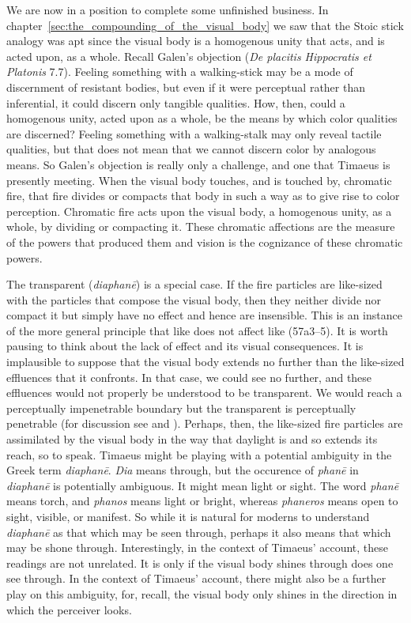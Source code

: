 We are now in a position to complete some unfinished business. In chapter~\ref{sec:the_compounding_of_the_visual_body} we saw that the Stoic stick analogy was apt since the visual body is a homogenous unity that acts, and is acted upon, as a whole. Recall Galen's objection (\emph{De placitis Hippocratis et Platonis} 7.7). Feeling something with a walking-stick may be a mode of discernment of resistant bodies, but even if it were perceptual rather than inferential, it could discern only tangible qualities. How, then, could a homogenous unity, acted upon as a whole, be the means by which color qualities are discerned? Feeling something with a walking-stalk may only reveal tactile qualities, but that does not mean that we cannot discern color by analogous means. So Galen's objection is really only a challenge, and one that Timaeus is presently meeting. When the visual body touches, and is touched by, chromatic fire, that fire divides or compacts that body in such a way as to give rise to color perception. Chromatic fire acts upon the visual body, a homogenous unity, as a whole, by dividing or compacting it. These chromatic affections are the measure of the powers that produced them and vision is the cognizance of these chromatic powers.

The transparent (\emph{diaphanē}) is a special case. If the fire particles are like-sized with the particles that compose the visual body, then they neither divide nor compact it but simply have no effect and hence are insensible. This is an instance of the more general principle that like does not affect like (57a3--5). It is worth pausing to think about the lack of effect and its visual consequences. It is implausible to suppose that the visual body extends no further than the like-sized effluences that it confronts. In that case, we could see no further, and these effluences would not properly be understood to be transparent. We would reach a perceptually impenetrable boundary but the transparent is perceptually penetrable (for discussion see \citealt{Crowther:2018yt} and \citealt{Kalderon:2018wn}). Perhaps, then, the like-sized fire particles are assimilated by the visual body in the way that daylight is and so extends its reach, so to speak. Timaeus might be playing with a potential ambiguity in the Greek term \emph{diaphanē}. \emph{Dia} means through, but the occurence of \emph{phanē} in \emph{diaphanē} is potentially ambiguous. It might mean light or sight. The word \emph{phanē} means torch, and \emph{phanos} means light or bright, whereas \emph{phaneros} means open to sight, visible, or manifest. So while it is natural for moderns to understand \emph{diaphanē} as that which may be seen through, perhaps it also means that which may be shone through. Interestingly, in the context of Timaeus' account, these readings are not unrelated. It is only if the visual body shines through does one see through. In the context of Timaeus' account, there might also be a further play on this ambiguity, for, recall, the visual body only shines in the direction in which the perceiver looks.

